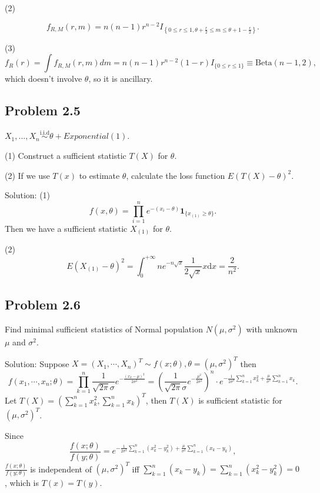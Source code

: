 (2)

\[
f_{R,M}(r,m)=n(n-1)r^{n-2}I_{\left\{0\leq r\leq 1,\theta+\frac{r}{2}\leq m\leq\theta+1-\frac{r}{2}\right\}}.
\]

(3)
\[
f_{R}(r)=\int f_{R,M}(r,m)dm=n(n-1)r^{n-2}(1-r)I_{\{0\leq r\leq 1\}}\equiv\text{Beta}(n-1,2),
\]
which doesn't involve $\theta$, so it is ancillary.

\subsection*{Problem 2.5}
$X_{1},...,X_{n}\overset{\text{i.i.d}}{\sim}\theta+Exponential(1).$

(1) Construct a sufficient statistic $T(X)$ for $\theta$.

(2) If we use $T(x)$ to estimate $\theta$, calculate the loss function $E(T(X)-\theta)^{2}$.

{Solution:}
(1)
\[
f(x,\theta)=\prod_{i=1}^{n}e^{-(x_{i}-\theta)}\mathbf{1}_{\{x_{(1)}\geq\theta\}}.
\]
Then we have a sufficient statistic $X_{(1)}$ for $\theta$.

(2)
\[
E(X_{(1)}-\theta)^{2}=\int_{0}^{+\infty}ne^{-n\sqrt{x}}\frac{1}{2\sqrt{x}}x\mathrm{d}x=\frac{2}{n^{2}}.
\]

\subsection*{Problem 2.6}
Find minimal sufficient statistics of Normal population $N\left(\mu,\sigma^{2}\right)$ with unknown $\mu$ and $\sigma^{2}$.

{Solution:}
Suppose $X=(X_{1},\cdots,X_{n})^{T}\sim f(x;\theta),\theta=(\mu,\sigma^{2})^{T}$ then
\[
f\left(x_{1},\cdots,x_{n};\theta\right)=\prod_{k=1}^{n}\frac{1}{\sqrt{2\pi}\sigma}e^{-\frac{\left(x_{k}-\mu\right)^{2}}{2\sigma^{2}}}=\left(\frac{1}{\sqrt{2\pi}\sigma}e^{-\frac{\mu^{2}}{2\sigma^{2}}}\right)^{n}\cdot e^{-\frac{1}{2\sigma^{2}}\sum_{k=1}^{n}x_{k}^{2}+\frac{\mu}{\sigma^{2}}\sum_{k=1}^{n}x_{k}}.
\]
Let $T(X)=\left(\sum_{k=1}^{n}x_{k}^{2},\sum_{k=1}^{n}x_{k}\right)^{T}$, then $T(X)$ is sufficient statistic for $\left(\mu,\sigma^{2}\right)^{T}$.

Since
\[\frac{f(x;\theta)}{f(y;\theta)}=e^{-\frac{1}{2\sigma^{2}}\sum_{k=1}^{n}\left(x_{k}^{2}-y_{k}^{2}\right)+\frac{\mu}{\sigma^{2}}\sum_{k=1}^{n}\left(x_{k}-y_{k}\right)},\]
$\frac{f(x;\theta)}{f(y;\theta)}$ is independent of $\left(\mu,\sigma^{2}\right)^{T}$ iff $\sum_{k=1}^{n}\left(x_{k}-y_{k}\right)=\sum_{k=1}^{n}\left(x_{k}^{2}-y_{k}^{2}\right)=0$, which is $T(x)=T(y)$.

